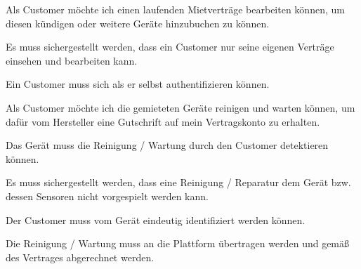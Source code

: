 \begin{tcolorbox}[colback=white,colframe=BrickRed!50!black, colbacktitle=BrickRed!75!black,title=\textbf{\underline{C3} Anpassung Mietvertrag}]
  \label{req:c3}
  \glqq Als Customer möchte ich einen laufenden Mietverträge bearbeiten können, um diesen kündigen oder weitere Geräte hinzubuchen zu können. \grqq
  \tcblower
  \begin{tcolorbox}[colback=white,colframe=white!50!black, colbacktitle=white!75!black,title=Task C3.1]
    Es muss sichergestellt werden, dass ein Customer nur seine eigenen Verträge einsehen und bearbeiten kann.
  \end{tcolorbox}
  \begin{tcolorbox}[colback=white,colframe=white!50!black, colbacktitle=white!75!black,title=Task C3.2]
    Ein Customer muss sich als er selbst authentifizieren können.
  \end{tcolorbox}
\end{tcolorbox}

\begin{tcolorbox}[colback=white,colframe=BrickRed!50!black, colbacktitle=BrickRed!75!black,title=\textbf{\underline{C4} Geräte warten}]
  \label{req:c4}
  \glqq Als Customer möchte ich die gemieteten Geräte reinigen und warten können, um dafür vom Hersteller eine Gutschrift auf mein Vertragskonto zu erhalten. \grqq
  \tcblower
  \begin{tcolorbox}[colback=white,colframe=white!50!black, colbacktitle=white!75!black,title=Task C4.1]
    Das Gerät muss die Reinigung / Wartung durch den Customer detektieren können.
  \end{tcolorbox}
  \begin{tcolorbox}[colback=white,colframe=white!50!black, colbacktitle=white!75!black,title=Task C4.2]
    Es muss sichergestellt werden, dass eine Reinigung / Reparatur dem Gerät bzw. dessen Sensoren nicht vorgespielt werden kann.
  \end{tcolorbox}
  \begin{tcolorbox}[colback=white,colframe=white!50!black, colbacktitle=white!75!black,title=Task C4.1]
    Der Customer muss vom Gerät eindeutig identifiziert werden können.
  \end{tcolorbox}
  \begin{tcolorbox}[colback=white,colframe=white!50!black, colbacktitle=white!75!black,title=Task C4.2]
    Die Reinigung / Wartung muss an die Plattform übertragen werden und gemäß des Vertrages abgerechnet werden.
  \end{tcolorbox}
\end{tcolorbox}

